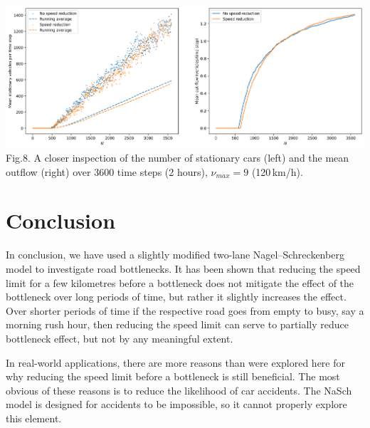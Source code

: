 \documentclass[11pt]{article}
\begin{document}
	\begin{center}
		\includegraphics[scale=0.46]{Figures/Speedlimit_bottleneck_vmax7_zoomed.png}\\
		Fig.8.	
		A closer inspection of the number of stationary cars (left) and the mean outflow (right) over 3600 time steps (2 hours), $\nu_{max}=9$ (120\,km/h). \\
	\end{center}
	
	\section{Conclusion}\label{sec:conclusion}
	
	In conclusion, we have used a slightly modified two-lane Nagel--Schreckenberg model to investigate road bottlenecks. It has been shown that reducing the speed limit for a few kilometres before a bottleneck does not mitigate the effect of the bottleneck over long periods of time, but rather it slightly increases the effect. Over shorter periods of time if the respective road goes from empty to busy, say a morning rush hour, then reducing the speed limit can serve to partially reduce bottleneck effect, but not by any meaningful extent.
	
	In real-world applications, there are more reasons than were explored here for why reducing the speed limit before a bottleneck is still beneficial. The most obvious of these reasons is to reduce the likelihood of car accidents. The NaSch model is designed for accidents to be impossible, so it cannot properly explore this element.
	
	\newpage
	
	
	
	
\end{document}
